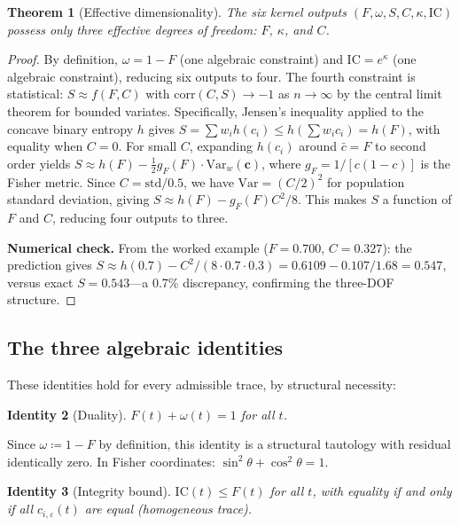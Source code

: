 \documentclass[
  aps,
  prd,
  twocolumn,
  superscriptaddress,
  nofootinbib,
  floatfix
]{revtex4-2}
\newtheorem{theorem}{Theorem}
\newtheorem{identity}[theorem]{Identity}
\newcommand{\eps}{\varepsilon}
\newcommand{\tvec}{\mathbf{c}}
\newcommand{\IC}{\mathrm{IC}}
\newcommand{\gF}{g_{\!F}}
\begin{document}
\begin{theorem}[Effective dimensionality]
\label{thm:dof}
The six kernel outputs $(F, \omega, S, C, \kappa, \IC)$ possess
only three effective degrees of freedom: $F$, $\kappa$, and $C$.
\end{theorem}

\begin{proof}
By definition, $\omega = 1 - F$ (one algebraic constraint) and
$\IC = e^\kappa$ (one algebraic constraint), reducing six outputs
to four.  The fourth constraint is statistical:
$S \approx f(F, C)$ with $\mathrm{corr}(C, S) \to -1$ as
$n \to \infty$ by the central limit theorem for bounded variates.
Specifically, Jensen's inequality applied to the concave binary
entropy $h$ gives $S = \sum w_i h(c_i) \leq h(\sum w_i c_i) = h(F)$,
with equality when $C = 0$.  For small $C$, expanding $h(c_i)$
around $\bar{c} = F$ to second order yields
$S \approx h(F) - \tfrac{1}{2}\gF(F) \cdot \mathrm{Var}_w(\tvec)$,
where $\gF = 1/[c(1{-}c)]$ is the Fisher metric.  Since
$C = \mathrm{std}/0.5$, we have $\mathrm{Var} = (C/2)^2$ for
population standard deviation, giving $S \approx h(F) - \gF(F) C^2/8$.
This makes $S$ a function of $F$ and $C$, reducing four outputs to
three.

\noindent\textbf{Numerical check.}  From the worked example
($F = 0.700$, $C = 0.327$): the
prediction gives $S \approx h(0.7) - C^2/(8 \cdot 0.7 \cdot 0.3)
= 0.6109 - 0.107/1.68 = 0.547$, versus exact $S = 0.543$---a
0.7\% discrepancy, confirming the three-DOF structure.
\end{proof}

\subsection{The three algebraic identities}

These identities hold for every admissible trace, by structural
necessity:

\begin{identity}[Duality]
\label{id:duality}
$F(t) + \omega(t) = 1$ for all $t$.
\end{identity}

\noindent Since $\omega \coloneqq 1 - F$ by definition, this
identity is a structural tautology with residual identically zero.
In Fisher coordinates: $\sin^2\theta + \cos^2\theta = 1$.

\begin{identity}[Integrity bound]
\label{id:bound}
$\IC(t) \leq F(t)$ for all $t$, with equality if and only if all
$c_{i,\eps}(t)$ are equal (homogeneous trace).
\end{identity}
\end{document}
